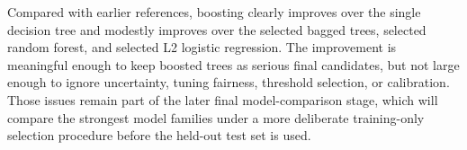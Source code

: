 Compared with earlier references, boosting clearly improves over the single decision tree and modestly improves over the selected bagged trees, selected random forest, and selected L2 logistic regression. The improvement is meaningful enough to keep boosted trees as serious final candidates, but not large enough to ignore uncertainty, tuning fairness, threshold selection, or calibration. Those issues remain part of the later final model-comparison stage, which will compare the strongest model families under a more deliberate training-only selection procedure before the held-out test set is used.
